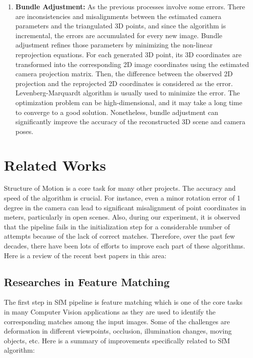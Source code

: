 \documentclass[11pt]{article}
\begin{document}
\begin{enumerate}
        \item \textbf{Bundle Adjustment:} As the previous processes involve some errors. There are inconsistencies
        and misalignments between the estimated camera parameters and the triangulated 3D points, and since the algorithm
        is incremental, the errors are accumulated for every new image. Bundle adjustment refines those parameters by
        minimizing the non-linear reprojection equations. For each generated 3D point, its 3D coordinates are
        transformed into the corresponding 2D image coordinates using the estimated camera projection matrix.
        Then, the difference between the observed 2D projection and the reprojected 2D coordinates is considered as the error.
        Levenberg-Marquardt algorithm is usually used to minimize the error.
        The optimization problem can be high-dimensional, and it may take a long time to converge to a good solution.
        Nonetheless, bundle adjustment can significantly improve the accuracy of the reconstructed 3D scene and camera poses.

    \end{enumerate}

    \section{Related Works}
    Structure of Motion is a core task for many other projects. The accuracy and speed
    of the algorithm is crucial. For instance, even a minor rotation error of 1 degree in the camera can lead
    to significant misalignment of point coordinates in meters, particularly in open scenes. Also, during our
    experiment, it is observed that the pipeline fails in the initialization step for a considerable number of attempts
    because of the lack of correct matches.
    Therefore, over the past few decades, there have been lots of efforts to improve each part of these algorithms.
    Here is a review of the recent best papers in this area:

    \subsection{Researches in Feature Matching}
    The first step in SfM pipeline is feature matching which
    is one of the core tasks in many Computer Vision applications as they are used to identify the corresponding
    matches among the input images. Some of the challenges are deformation in different viewpoints, occlusion,
    illumination changes, moving objects, etc. Here is a summary of improvements specifically related to SfM algorithm:
\end{document}
